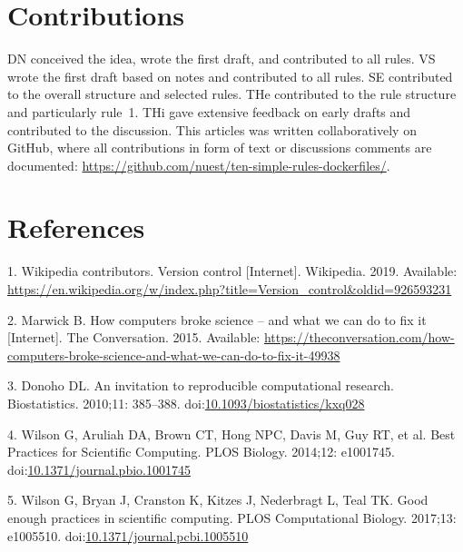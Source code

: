 \documentclass[10pt,letterpaper]{article}
\begin{document}
\hypertarget{contributions}{%
\section*{Contributions}\label{contributions}}

DN conceived the idea, wrote the first draft, and contributed to all
rules. VS wrote the first draft based on notes and contributed to all
rules. SE contributed to the overall structure and selected rules. THe
contributed to the rule structure and particularly rule~1. THi gave
extensive feedback on early drafts and contributed to the discussion.
This articles was written collaboratively on GitHub, where all
contributions in form of text or discussions comments are documented:
\url{https://github.com/nuest/ten-simple-rules-dockerfiles/}.

\hypertarget{references}{%
\section*{References}\label{references}}

\hypertarget{refs}{}
\leavevmode\hypertarget{ref-wikipedia_contributors_version_2019}{}%
1. Wikipedia contributors. Version control {[}Internet{]}. Wikipedia.
2019. Available:
\url{https://en.wikipedia.org/w/index.php?title=Version_control\&oldid=926593231}

\leavevmode\hypertarget{ref-marwick_how_2015}{}%
2. Marwick B. How computers broke science -- and what we can do to fix
it {[}Internet{]}. The Conversation. 2015. Available:
\url{https://theconversation.com/how-computers-broke-science-and-what-we-can-do-to-fix-it-49938}

\leavevmode\hypertarget{ref-donoho_invitation_2010}{}%
3. Donoho DL. An invitation to reproducible computational research.
Biostatistics. 2010;11: 385--388.
doi:\href{https://doi.org/10.1093/biostatistics/kxq028}{10.1093/biostatistics/kxq028}

\leavevmode\hypertarget{ref-wilson_best_2014}{}%
4. Wilson G, Aruliah DA, Brown CT, Hong NPC, Davis M, Guy RT, et al.
Best Practices for Scientific Computing. PLOS Biology. 2014;12:
e1001745.
doi:\href{https://doi.org/10.1371/journal.pbio.1001745}{10.1371/journal.pbio.1001745}

\leavevmode\hypertarget{ref-wilson_good_2017}{}%
5. Wilson G, Bryan J, Cranston K, Kitzes J, Nederbragt L, Teal TK. Good
enough practices in scientific computing. PLOS Computational Biology.
2017;13: e1005510.
doi:\href{https://doi.org/10.1371/journal.pcbi.1005510}{10.1371/journal.pcbi.1005510}
\end{document}
